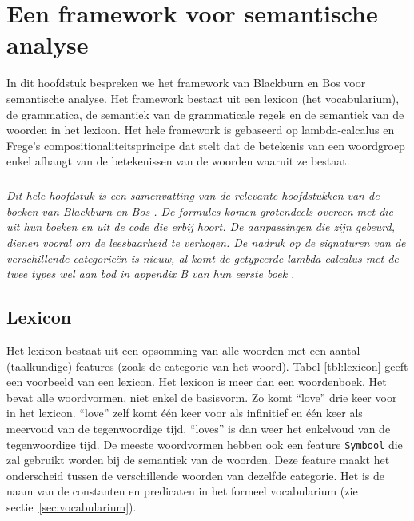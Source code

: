\chapter{Een framework voor semantische analyse}
\label{ch:framework}
In dit hoofdstuk bespreken we het framework van Blackburn en Bos \cite{Blackburn2005, Blackburn2006} voor semantische analyse. Het framework bestaat uit een lexicon (het vocabularium), de grammatica, de semantiek van de grammaticale regels en de semantiek van de woorden in het lexicon. Het hele framework is gebaseerd op lambda-calcalus en Frege's compositionaliteitsprincipe dat stelt dat de betekenis van een woordgroep enkel afhangt van de betekenissen van de woorden waaruit ze bestaat.

\paragraph{} \textit{Dit hele hoofdstuk is een samenvatting van de relevante hoofdstukken van de boeken van Blackburn en Bos \cite{Blackburn2005, Blackburn2006}. De formules komen grotendeels overeen met die uit hun boeken en uit de code die erbij hoort. De aanpassingen die zijn gebeurd, dienen vooral om de leesbaarheid te verhogen. De nadruk op de signaturen van de verschillende categorieën is nieuw, al komt de getypeerde lambda-calcalus met de twee types wel aan bod in appendix B van hun eerste boek \cite{Blackburn2005}.}

\section{Lexicon}
Het lexicon bestaat uit een opsomming van alle woorden met een aantal (taalkundige) features (zoals de categorie van het woord). Tabel \ref{tbl:lexicon} geeft een voorbeeld van een lexicon. Het lexicon is meer dan een woordenboek. Het bevat alle woordvormen, niet enkel de basisvorm. Zo komt ``love'' drie keer voor in het lexicon. ``love'' zelf komt één keer voor als infinitief en één keer als meervoud van de tegenwoordige tijd. ``loves'' is dan weer het enkelvoud van de tegenwoordige tijd. De meeste woordvormen hebben ook een feature \texttt{Symbool} die zal gebruikt worden bij de semantiek van de woorden. Deze feature maakt het onderscheid tussen de verschillende woorden van dezelfde categorie. Het is de naam van de constanten en predicaten in het formeel vocabularium (zie sectie~\ref{sec:vocabularium}).

